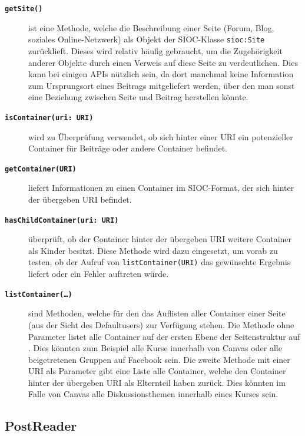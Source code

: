 \begin{description}
    \item[\textbf{\texttt{getSite()}}] ist eine Methode, welche die Beschreibung einer Seite (Forum, Blog, soziales Online-Netzwerk) als Objekt der SIOC-Klasse \texttt{sioc:Site} zurücklieft. Dieses wird relativ häufig gebraucht, um die Zugehörigkeit anderer Objekte durch einen Verweis auf diese Seite zu verdeutlichen. Dies kann bei einigen APIs nützlich sein, da dort manchmal keine Information zum Ursprungsort eines Beitrags mitgeliefert werden, über den man sonst eine Beziehung zwischen Seite und Beitrag herstellen könnte.

    \item[\textbf{\texttt{isContainer(uri: URI)}}] wird zu Überprüfung verwendet, ob sich hinter einer URI ein potenzieller Container für Beiträge oder andere Container befindet. 

    \item[\textbf{\texttt{getContainer(URI)}}] liefert Informationen zu einen Container im SIOC-Format, der sich hinter der übergeben URI befindet.

    \item[\textbf{\texttt{hasChildContainer(uri: URI)}}] überprüft, ob der Container hinter der übergeben URI weitere Container als Kinder besitzt. Diese Methode wird dazu eingesetzt, um vorab zu testen, ob der Aufruf von \texttt{listContainer(URI)} das gewünschte Ergebnis liefert oder ein Fehler auftreten würde. 

    \item[\textbf{\texttt{listContainer(\dots)}}] sind Methoden, welche für den das Auflisten aller Container einer Seite (aus der Sicht des Defaultusers) zur Verfügung stehen. Die Methode ohne Parameter listet alle Container auf der ersten Ebene der Seitenstruktur auf . Dies könnten zum Beispiel alle Kurse innerhalb von Canvas oder alle beigetretenen Gruppen auf Facebook sein. Die zweite Methode mit einer URI als Parameter gibt eine Liste alle Container, welche den Container hinter der übergeben URI als Elternteil haben zurück. Dies könnten im Falle von Canvas alle Diskussionsthemen innerhalb eines Kurses sein.
\end{description}


\pagebreak

\subsection{PostReader} %
\label{sub:postreader}

